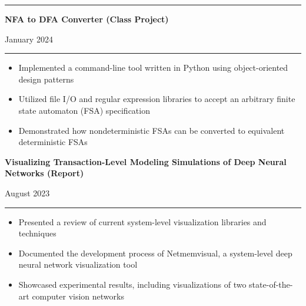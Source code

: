 \documentclass[letter]{article}
\begin{document}
    \vspace{4pt}
    \hrule height 1pt
    \vspace{4pt}

    \noindent
    \begin{minipage}[c]{0.8\linewidth}
        \noindent \textbf{NFA to DFA Converter (Class Project)}
    \end{minipage}
    \begin{minipage}[c]{0.19\linewidth}
        \begin{flushright}
            January 2024
        \end{flushright}
    \end{minipage}
    \vspace{4pt}
    \hrule
    \vspace{4pt}
    \noindent
    \begin{itemize}[noitemsep, topsep=0pt]
        \item Implemented a command-line tool written in Python using object-oriented design patterns
        \item Utilized file I/O and regular expression libraries to accept an arbitrary finite state automaton (FSA) specification
        \item Demonstrated how nondeterministic FSAs can be converted to equivalent deterministic FSAs
    \end{itemize}
    \medskip

    \noindent
    \begin{minipage}[c]{0.8\linewidth}
    \noindent \textbf{Visualizing Transaction-Level Modeling Simulations of Deep Neural Networks (Report)}
    \end{minipage}
    \begin{minipage}[c]{0.19\linewidth}
        \begin{flushright}
            August 2023
        \end{flushright}
    \end{minipage}
    \vspace{4pt}
    \hrule
    \vspace{4pt}
    \noindent
    \begin{itemize}[noitemsep, topsep=0pt]
        \item Presented a review of current system-level visualization libraries and techniques
        \item Documented the development process of Netmemvisual, a system-level deep neural network visualization tool
        \item Showcased experimental results, including visualizations of two state-of-the-art computer vision networks
    \end{itemize}
    \medskip
\end{document}
